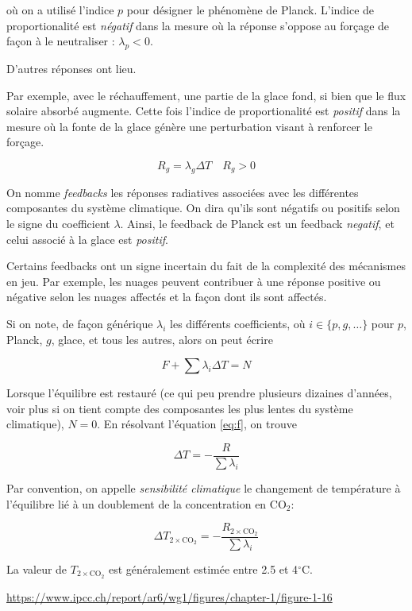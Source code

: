 où on a utilisé l'indice $p$ pour désigner le phénomène de Planck. L'indice de proportionalité est \emph{négatif} dans la mesure où la réponse s'oppose au forçage de façon à le neutraliser : $\lambda_p < 0$. 

D'autres réponses ont lieu. 

Par exemple, avec le réchauffement, une partie de la glace fond, si bien que le flux solaire absorbé augmente. Cette fois l'indice de proportionalité est \emph{positif} dans la mesure où la fonte de la glace génère une perturbation visant à renforcer le forçage. 

\begin{equation}
  R_g = \lambda_g \Delta T \quad R_g>0
\end{equation}

On nomme \emph{feedbacks} les réponses radiatives associées avec les différentes composantes du système climatique. On dira qu'ils sont négatifs ou positifs selon le signe du coefficient $\lambda$. Ainsi, le feedback de Planck est un feedback \emph{negatif}, et celui associé à la glace est \emph{positif}. 

Certains feedbacks ont un signe incertain du fait de la complexité des mécanismes en jeu. Par exemple, les nuages peuvent contribuer à une réponse positive ou négative selon les nuages affectés et la façon dont ils sont affectés. 

Si on note, de façon générique $\lambda_i$ les différents coefficients, où $i\in\{p, g, \ldots\}$ pour $p$, Planck, $g$, glace, et tous les autres, alors on peut écrire 

\begin{equation}\label{eq:f}
  F + \sum \lambda_i \Delta T = N
\end{equation}

Lorsque l'équilibre est restauré (ce qui peu prendre plusieurs dizaines d'années, voir plus si on tient compte des composantes les plus lentes du système climatique), $N=0$. En résolvant l'équation \eqref{eq:f}, on trouve 

\begin{equation}
  \Delta T = - \frac{R}{\sum \lambda_i}
\end{equation}



Par convention, on appelle \emph{sensibilité climatique} le changement de température à l'équilibre lié à un doublement de la concentration en CO$_2$:

\def\cc{\ensuremath{2\times\text{CO}_2}}

\begin{equation}
  \Delta T_{\cc} = - \frac{R_{\cc}}{\sum \lambda_i}
\end{equation}

La valeur de $T_{\cc}$ est généralement estimée entre 2.5 et 4$^\circ$C. 

\url{https://www.ipcc.ch/report/ar6/wg1/figures/chapter-1/figure-1-16}


